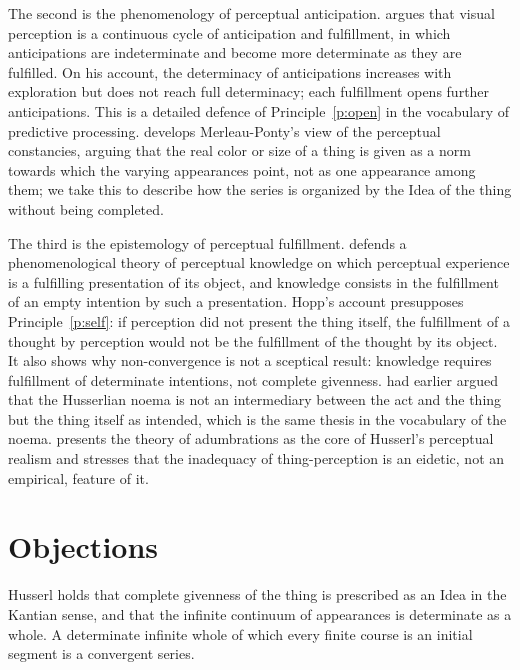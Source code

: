 \documentclass{situationist-preprint}
\begin{document}
The second is the phenomenology of perceptual anticipation. \citet{Madary2017} argues that visual perception is a continuous cycle of anticipation and fulfillment, in which anticipations are indeterminate and become more determinate as they are fulfilled. On his account, the determinacy of anticipations increases with exploration but does not reach full determinacy; each fulfillment opens further anticipations. This is a detailed defence of Principle~\ref{p:open} in the vocabulary of predictive processing. \citet{Kelly2005} develops Merleau-Ponty's view of the perceptual constancies, arguing that the real color or size of a thing is given as a norm towards which the varying appearances point, not as one appearance among them; we take this to describe how the series is organized by the Idea of the thing without being completed.

The third is the epistemology of perceptual fulfillment. \citet{Hopp2011} defends a phenomenological theory of perceptual knowledge on which perceptual experience is a fulfilling presentation of its object, and knowledge consists in the fulfillment of an empty intention by such a presentation. Hopp's account presupposes Principle~\ref{p:self}: if perception did not present the thing itself, the fulfillment of a thought by perception would not be the fulfillment of the thought by its object. It also shows why non-convergence is not a sceptical result: knowledge requires fulfillment of determinate intentions, not complete givenness. \citet{Drummond1990} had earlier argued that the Husserlian noema is not an intermediary between the act and the thing but the thing itself as intended, which is the same thesis in the vocabulary of the noema. \citet{Zahavi2003} presents the theory of adumbrations as the core of Husserl's perceptual realism and stresses that the inadequacy of thing-perception is an eidetic, not an empirical, feature of it.

\section{Objections}\label{s:objections}

\begin{objection}
Husserl holds that complete givenness of the thing is prescribed as an Idea in the Kantian sense, and that the infinite continuum of appearances is determinate as a whole. A determinate infinite whole of which every finite course is an initial segment is a convergent series.
\end{objection}
\end{document}

